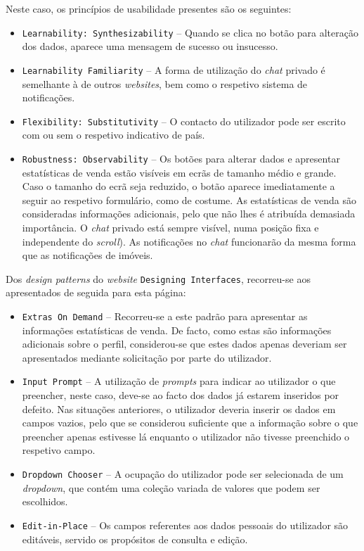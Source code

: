 Neste caso, os princípios de usabilidade presentes são os seguintes:

\begin{itemize}
    \item \texttt{Learnability: Synthesizability} -- Quando se clica no botão para alteração dos dados, aparece uma mensagem de sucesso ou insucesso.
    
    \item \texttt{Learnability Familiarity} -- A forma de utilização do \textit{chat} privado é semelhante à de outros \textit{websites}, bem como o respetivo sistema de notificações.
    
    \item \texttt{Flexibility: Substitutivity} -- O contacto do utilizador pode ser escrito com ou sem o respetivo indicativo de país.
    
    \item \texttt{Robustness: Observability} --  Os botões para alterar dados e apresentar estatísticas de venda estão visíveis em ecrãs de tamanho médio e grande. Caso o tamanho do ecrã seja reduzido, o botão aparece imediatamente a seguir ao respetivo formulário, como de costume. As estatísticas de venda são consideradas informações adicionais, pelo que não lhes é atribuída demasiada importância. O \textit{chat} privado está sempre visível, numa posição fixa e independente do \textit{scroll}). As notificações no \textit{chat} funcionarão da mesma forma que as notificações de imóveis.
\end{itemize}


Dos \textit{design patterns} do \textit{website} \texttt{Designing Interfaces}, recorreu-se aos apresentados de seguida para esta página:

\begin{itemize}
    \item \texttt{Extras On Demand} -- Recorreu-se a este padrão para apresentar as informações estatísticas de venda. De facto, como estas são informações adicionais sobre o perfil, considerou-se que estes dados apenas deveriam ser apresentados mediante solicitação por parte do utilizador.
    
    \item \texttt{Input Prompt} -- A utilização de \textit{prompts} para indicar ao utilizador o que preencher, neste caso, deve-se ao facto dos dados já estarem inseridos por defeito. Nas situações anteriores, o utilizador deveria inserir os dados em campos vazios, pelo que se considerou suficiente que a informação sobre o que preencher apenas estivesse lá enquanto o utilizador não tivesse preenchido o respetivo campo.
    
    \item \texttt{Dropdown Chooser} -- A ocupação do utilizador pode ser selecionada de um \textit{dropdown}, que contém uma coleção variada de valores que podem ser escolhidos.
    
    \item \texttt{Edit-in-Place} -- Os campos referentes aos dados pessoais do utilizador são editáveis, servido os propósitos de consulta e edição.
\end{itemize}

